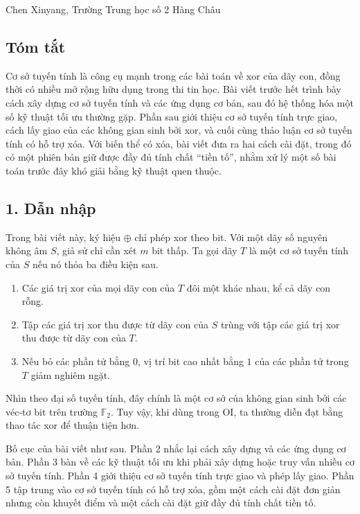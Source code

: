 \documentclass[11pt]{article}
\begin{document}
\begin{center}
Chen Xinyang, Trường Trung học số 2 Hàng Châu
\end{center}

\subsection*{Tóm tắt}

Cơ sở tuyến tính là công cụ mạnh trong các bài toán về xor của dãy con, đồng
thời có nhiều mở rộng hữu dụng trong thi tin học. Bài viết trước hết trình bày
cách xây dựng cơ sở tuyến tính và các ứng dụng cơ bản, sau đó hệ thống hóa một
số kỹ thuật tối ưu thường gặp. Phần sau giới thiệu cơ sở tuyến tính trực giao,
cách lấy giao của các không gian sinh bởi xor, và cuối cùng thảo luận cơ sở
tuyến tính có hỗ trợ xóa. Với biến thể có xóa, bài viết đưa ra hai cách cài
đặt, trong đó có một phiên bản giữ được đầy đủ tính chất ``tiền tố'', nhằm xử
lý một số bài toán trước đây khó giải bằng kỹ thuật quen thuộc.

\subsection*{1. Dẫn nhập}

Trong bài viết này, ký hiệu \(\oplus\) chỉ phép xor theo bit. Với một dãy số
nguyên không âm \(S\), giả sử chỉ cần xét \(m\) bit thấp. Ta gọi dãy \(T\) là
một cơ sở tuyến tính của \(S\) nếu nó thỏa ba điều kiện sau.
\begin{enumerate}
  \item Các giá trị xor của mọi dãy con của \(T\) đôi một khác nhau, kể cả dãy
  con rỗng.
  \item Tập các giá trị xor thu được từ dãy con của \(S\) trùng với tập các giá
  trị xor thu được từ dãy con của \(T\).
  \item Nếu bỏ các phần tử bằng \(0\), vị trí bit cao nhất bằng \(1\) của các
  phần tử trong \(T\) giảm nghiêm ngặt.
\end{enumerate}
Nhìn theo đại số tuyến tính, đây chính là một cơ sở của không gian sinh bởi các
véc-tơ bit trên trường \(\mathbb F_2\). Tuy vậy, khi dùng trong OI, ta thường
diễn đạt bằng thao tác xor để thuận tiện hơn.

Bố cục của bài viết như sau. Phần 2 nhắc lại cách xây dựng và các ứng dụng cơ
bản. Phần 3 bàn về các kỹ thuật tối ưu khi phải xây dựng hoặc truy vấn nhiều cơ
sở tuyến tính. Phần 4 giới thiệu cơ sở tuyến tính trực giao và phép lấy giao.
Phần 5 tập trung vào cơ sở tuyến tính có hỗ trợ xóa, gồm một cách cài đặt đơn
giản nhưng còn khuyết điểm và một cách cài đặt giữ đầy đủ tính chất tiền tố.
\end{document}
